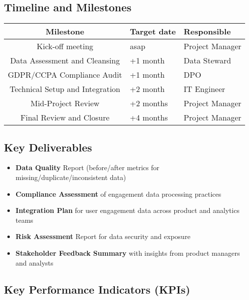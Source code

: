 \documentclass[11pt,a4paper,computermodern]{article}
\begin{document}
\subsection*{Timeline and Milestones}

\begin{table}[ht]
	\centering
	\begin{threeparttable}
		\label{table:milestones}
		\begin{tabularx}{0.99\textwidth}{c >{\centering\arraybackslash}X >{\centering\arraybackslash}X}
			\toprule
			Milestone & Target date & Responsible \\
			\midrule
			Kick-off meeting & asap & Project Manager \\
			Data Assessment and Cleansing & +1 month & Data Steward \\
			GDPR/CCPA Compliance Audit & +1 month & DPO \\
			Technical Setup and Integration & +2 month & IT Engineer \\
			Mid-Project Review & +2 months & Project Manager \\
			Final Review and Closure & +4 months & Project Manager \\
			\bottomrule
		\end{tabularx}
	\end{threeparttable}
\end{table}


\subsection*{Key Deliverables}

\begin{itemize}[itemsep=5pt, parsep=0pt]
	\item \textbf{Data Quality} Report (before/after metrics for missing/duplicate/inconsistent data)
	\item \textbf{Compliance Assessment} of engagement data processing practices
	\item \textbf{Integration Plan} for user engagement data across product and analytics teams
	\item \textbf{Risk Assessment} Report for data security and exposure
	\item \textbf{Stakeholder Feedback Summary} with insights from product managers and analysts
\end{itemize}


\subsection*{Key Performance Indicators (KPIs)}
\end{document}
